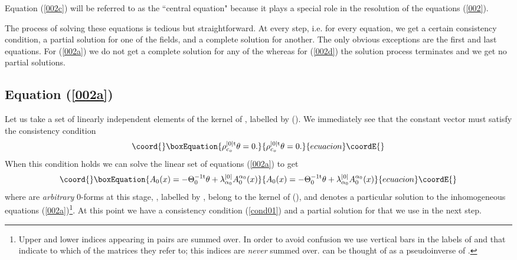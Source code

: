\documentclass[prd,a4paper,twocolumn,amssymb,amsmath,nofootinbib,showpacs]{revtex4}
\begin{document}
Equation (\ref{002c}) will be referred to as the ``central
equation" because it plays a special role in the resolution of the
equations (\ref{002}).

The process of solving these equations is tedious but
straightforward. At every step, i.e. for every equation, we get a
certain consistency condition, a partial solution for one of the
fields, and a complete solution for another. The only obvious
exceptions are the first and last equations. For (\ref{002a}) we
do not get a complete solution for any of the \coordHE{} whereas for
(\ref{002d}) the solution process terminates and we get no partial
solutions.

\subsection{\label{Eq1} Equation (\ref{002a})}

Let us take a set of linearly independent elements of the kernel
of \coordHE{}, \coordHE{} labelled by \coordHE{}
(\coordHE{}). We immediately see that the
constant vector \myHighlight{$\theta$}\coordHE{} must satisfy the consistency condition
\begin{equation}\coord{}\boxEquation{
\rho_{c_o}^{|0|\rm{t}}\theta=0\label{cond01}.
}{
\rho_{c_o}^{|0|\rm{t}}\theta=0.
}{ecuacion}\coordE{}\end{equation} When this
condition holds we can solve the linear set of equations
(\ref{002a}) to get
\begin{equation}\coord{}\boxEquation{
A_0(x)=-\Theta_0^{-1\rm{t}}\theta+
\lambda_{\alpha_0}^{|0|}A_0^{\alpha_0}(x)\label{cond02}
}{
A_0(x)=-\Theta_0^{-1\rm{t}}\theta+
\lambda_{\alpha_0}^{|0|}A_0^{\alpha_0}(x)}{ecuacion}\coordE{}\end{equation}
where \coordHE{} are \emph{arbitrary} 0-forms at this
stage, \coordHE{}, labelled by \coordHE{}, belong
to the kernel of \coordHE{}
(\coordHE{}), and
\coordHE{} denotes a particular solution to the
inhomogeneous equations (\ref{002a})\footnote{Upper and lower
indices appearing in pairs are summed over. In order to avoid
confusion we use vertical bars in the labels of \myHighlight{$\rho$}\coordHE{} and
\myHighlight{$\lambda$}\coordHE{} that indicate to which of the \myHighlight{$\Theta$}\coordHE{} matrices they
refer to; this indices are \emph{never} summed over.
\coordHE{} can be thought of as a pseudoinverse of
\coordHE{}.}. At this point we have a consistency condition
(\ref{cond01}) and a partial solution for \coordHE{} that we use in
the next step.
\end{document}
